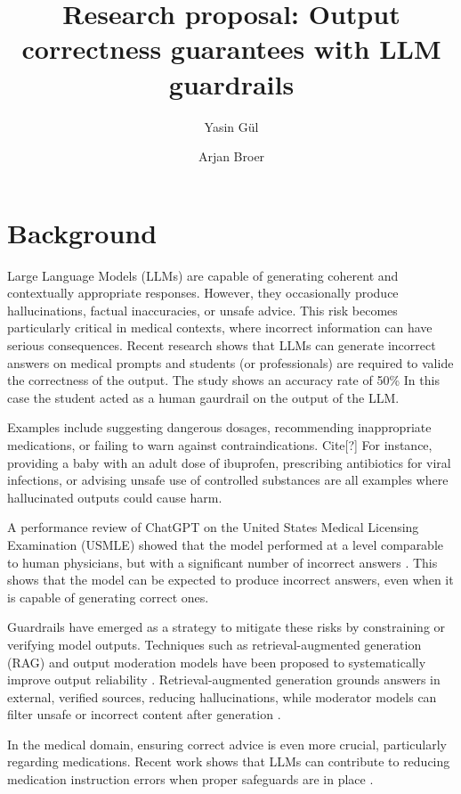 \documentclass[a4paper,doc,natbib]{apa6}
\title{Research proposal: Output correctness guarantees with LLM guardrails}
\author{Yasin G\"{u}l \and Arjan Broer}
\affiliation{Open University of the Netherlands}
\begin{document}
    \maketitle

    \section{Background}

    Large Language Models (LLMs) are capable of generating coherent and contextually appropriate responses.
    However, they occasionally produce hallucinations, factual inaccuracies, or unsafe advice.
    This risk becomes particularly critical in medical contexts, where incorrect information can have serious consequences.
    Recent research \cite{waldock2025curriculum} shows that LLMs can generate incorrect answers on medical prompts and students (or professionals) are required to valide the correctness of the output.
    The study shows an accuracy rate of 50\% In this case the student acted as a human gaurdrail on the output of the LLM.

    Examples include suggesting dangerous dosages, recommending inappropriate medications, or failing to warn against contraindications. Cite[?]
    For instance, providing a baby with an adult dose of ibuprofen, prescribing antibiotics for viral infections, or advising unsafe use of controlled substances are all examples where hallucinated outputs could cause harm.

    A performance review of ChatGPT on the United States Medical Licensing Examination (USMLE) showed that the model performed at a level comparable to human physicians, but with a significant number of incorrect answers \citep{kung2023performance}.
    This shows that the model can be expected to produce incorrect answers, even when it is capable of generating correct ones.

    Guardrails have emerged as a strategy to mitigate these risks by constraining or verifying model outputs.
    Techniques such as retrieval-augmented generation (RAG) and output moderation models have been proposed to systematically improve output reliability \citep{dong2024guardrails}.
    Retrieval-augmented generation grounds answers in external, verified sources, reducing hallucinations, while moderator models can filter unsafe or incorrect content after generation \citep{inan2023llamaguard}.

    In the medical domain, ensuring correct advice is even more crucial, particularly regarding medications.
    Recent work shows that LLMs can contribute to reducing medication instruction errors when proper safeguards are in place \citep{pais2024medication}.
\end{document}
